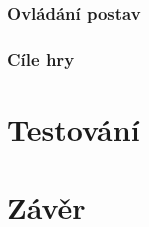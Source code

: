 \documentclass{report}
\begin{document}
\subsection{Ovládání postav}\label{sec:ovladanipostav}
\subsection{Cíle hry}\label{sec:cilehry}

\chapter{Testování}

 \chapter*{Závěr}



\end{document}
